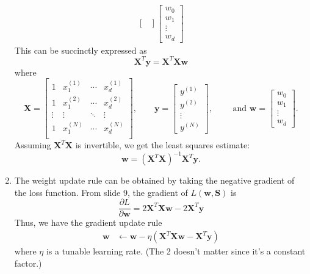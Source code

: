 \begin{enumerate}[label=(\alph*)]
\begin{align*}
\begin{bmatrix}
		      \end{bmatrix}
		      \begin{bmatrix}
			      w_0 \\ w_1 \\ \vdots \\ w_d
		      \end{bmatrix}
	      \end{align*}
	      This can be succinctly expressed as
	      \[
		      \bm{X}^T \bm{y} = \bm{X}^T \bm{X} \bm{w}
	      \]
	      where
	      \[
		      \bm{X} = \begin{bmatrix}
			      1      & x_1^{(1)} & \cdots & x_d^{(1)} \\
			      1      & x_1^{(2)} & \cdots & x_d^{(2)} \\
			      \vdots & \vdots    & \ddots & \vdots    \\
			      1      & x_1^{(N)} & \cdots & x_d^{(N)} \\
		      \end{bmatrix}
		      ,
		      \qquad
		      \bm{y} = \begin{bmatrix}
			      y^{(1)} \\ y^{(2)} \\ \vdots \\ y^{(N)}
		      \end{bmatrix}
		      ,
		      \qquad \text{ and }
		      \bm{w} = \begin{bmatrix}
			      w_0 \\ w_1 \\ \vdots \\ w_d
		      \end{bmatrix}.
	      \]
	      Assuming $\bm{X}^T \bm{X}$ is invertible, we get the
	      least squares estimate:
	      \[
		      \bm{w} = (\bm{X}^T \bm{X})^{-1} \bm{X}^T \bm{y}.
	      \]

	\item The weight update rule can be obtained by taking the negative gradient
	      of the loss function. From slide 9, the gradient of $L(\bm{w}, \bm{S})$ is
	      \[
		      \frac{\partial L}{\partial \bm{w}} = 2\bm{X}^T \bm{X} \bm{w} - 2\bm{X}^T \bm{y}
	      \]
	      Thus, we have the gradient update rule
	      \begin{align*}
		      \bm{w} & \leftarrow \bm{w} - \eta\left(\bm{X}^T \bm{X} \bm{w} - \bm{X}^T \bm{y}\right)
	      \end{align*}
	      where $\eta$ is a tunable learning rate. (The 2 doesn't matter since it's a constant factor.)
\end{enumerate}

